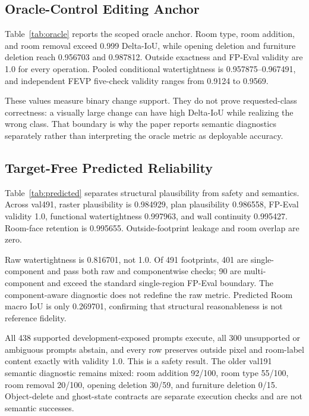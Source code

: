 \documentclass[10pt,twocolumn,letterpaper]{article}
\begin{document}
\subsection{Oracle-Control Editing Anchor}
Table~\ref{tab:oracle} reports the scoped oracle anchor. Room type, room addition,
and room removal exceed 0.999 Delta-IoU, while opening deletion and furniture
deletion reach 0.956703 and 0.987812. Outside exactness and FP-Eval validity are
1.0 for every operation. Pooled conditional watertightness is
0.957875--0.967491, and independent FEVP five-check validity ranges from 0.9124
to 0.9569.

These values measure binary change support. They do not prove requested-class
correctness: a visually large change can have high Delta-IoU while realizing the
wrong class. That boundary is why the paper reports semantic diagnostics
separately rather than interpreting the oracle metric as deployable accuracy.





\subsection{Target-Free Predicted Reliability}
Table~\ref{tab:predicted} separates structural plausibility from safety and
semantics. Across val491, raster plausibility is 0.984929, plan plausibility
0.986558, FP-Eval validity 1.0, functional watertightness 0.997963, and wall
continuity 0.995427. Room-face retention is 0.995655. Outside-footprint leakage
and room overlap are zero.

Raw watertightness is 0.816701, not 1.0. Of 491 footprints, 401 are
single-component and pass both raw and componentwise checks; 90 are
multi-component and exceed the standard single-region FP-Eval boundary. The
component-aware diagnostic does not redefine the raw metric. Predicted Room macro
IoU is only 0.269701, confirming that structural reasonableness is not reference
fidelity.

All 438 supported development-exposed prompts execute, all 300 unsupported or
ambiguous prompts abstain, and every row preserves outside pixel and room-label
content exactly with validity 1.0. This is a safety result. The older val191
semantic diagnostic remains mixed: room addition 92/100, room type 55/100, room
removal 20/100, opening deletion 30/59, and furniture deletion 0/15. Object-delete
and ghost-state contracts are separate execution checks and are not semantic
successes.
\end{document}
